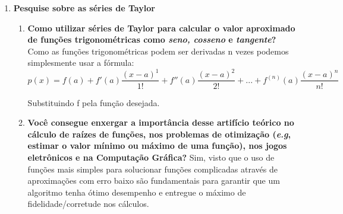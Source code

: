 \documentclass{abntex2}
\begin{document}
\begin{enumerate}
    \newpage
    \item \textbf{Pesquise sobre as séries de Taylor}
    \begin{enumerate}
      \item \textbf{Como utilizar séries de Taylor para calcular o valor aproximado de funções trigonométricas como \textit{seno, cosseno} e \textit{tangente}?} \newline
      Como as funções trigonométricas podem ser derivadas n vezes podemos simplesmente usar a fórmula:
      \\
      $$
        {\displaystyle p(x)=f(a)+f'(a){\frac {\left(x-a\right)^{1}}{1!}}+f''(a){\frac {\left(x-a\right)^{2}}{2!}}+...+f^{(n)}(a){\frac {\left(x-a\right)^{n}}{n!}}}
      $$

      Substituindo f pela função desejada.
      \item \textbf{Você consegue enxergar a importância desse artifício teórico no cálculo de raízes de funções, nos problemas de otimização (\textit{e.g}, estimar o valor mínimo ou máximo de uma função), nos jogos eletrônicos e na Computação Gráfica?} \newline
      Sim, visto que o uso de funções mais simples para solucionar funções complicadas através de aproximações com erro baixo são fundamentais para garantir que um algoritmo tenha ótimo desempenho e entregue o máximo de fidelidade/corretude nos cálculos.
    \end{enumerate}
  \end{enumerate}
\end{document}
